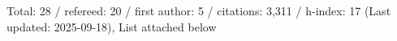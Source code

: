 Total: 28 / refereed: 20 / first author: 5 / citations: 3,311 / h-index: 17 (Last updated: 2025-09-18), List attached below